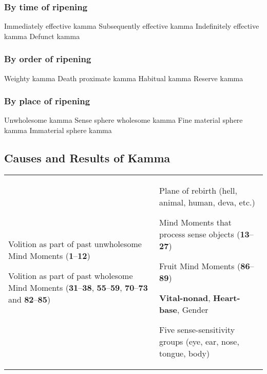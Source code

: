 \documentclass[a4 paper, 12pt]{article}
\begin{document}
\subsubsection*{By time of ripening}

 Immediately effective kamma  Subsequently effective kamma  Indefinitely effective kamma  Defunct kamma

\subsubsection*{By order of ripening}

 Weighty kamma  Death proximate kamma  Habitual kamma  Reserve kamma

\subsubsection*{By place of ripening}

 Unwholesome kamma  Sense sphere wholesome kamma  Fine material sphere kamma  Immaterial sphere kamma

\subsection*{Causes and Results of Kamma}

\begin{tabular*}{\textwidth}{L{\tabcolsep} | L{\tabcolsep}}
\toprule
{} &  \\
\midrule

Volition as part of past unwholesome Mind Moments (\textbf{1}--\textbf{12})

\vspace{2mm}

Volition as part of past wholesome Mind Moments (\textbf{31}--\textbf{38}, \textbf{55}--\textbf{59}, \textbf{70}--\textbf{73} and \textbf{82}--\textbf{85})
&
Plane of rebirth (hell, animal, human, deva, etc.)

\vspace{2mm}

Mind Moments that process sense objects (\textbf{13}--\textbf{27})

\vspace{2mm}

Fruit Mind Moments (\textbf{86}--\textbf{89})

\vspace{2mm}

\textbf{Vital-nonad}, \textbf{Heart-base}, Gender
\vspace{2mm}

Five sense-sensitivity groups (eye, ear, nose, tongue, body)
  \\
  
\bottomrule
\end{tabular*}
\end{document}

